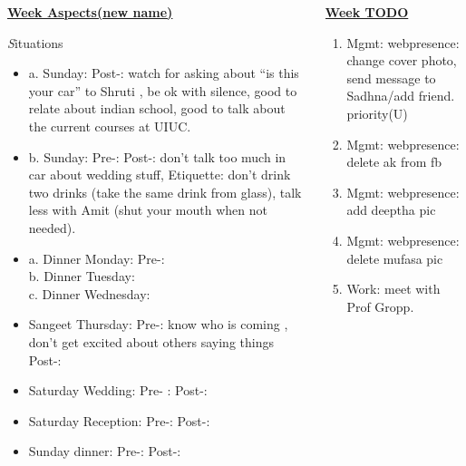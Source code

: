 \documentclass[serif,mathserif,final]{beamer}
\begin{document}
\begin{frame}{}
\begin{columns}[t]
\begin{column}{0.30\linewidth} {\textbf{\underline{Week Aspects(new name)}}}
\begin{block}{\textit Situations}
\begin{itemize}
      b. Saturday at Amit's house: Pre-: Post-: don't have to tell dad about when I first met Atul and Ridhima \\

\item \tiny 
  a. Sunday:  Post-: watch for asking about ``is this your car'' to Shruti ,  be ok with silence, good to relate about indian school, good to talk about the current courses at UIUC. \\

  \item \tiny  b. Sunday: Pre-: Post-: don't talk too much in car about wedding stuff, Etiquette: don't drink two drinks (take the same drink from glass), talk less with Amit (shut your mouth when not needed).\\

\item \tiny 
  
  a. Dinner Monday: Pre-:  \\ 
  b. Dinner Tuesday:   \\
  c. Dinner Wednesday:  \\

\item \tiny Sangeet Thursday: Pre-: know who is coming , don't get excited about others saying things Post-: 
\item \tiny Saturday Wedding: Pre- :   Post-: 
\item \tiny  Saturday Reception: Pre-:    Post-: 
\item \tiny  Sunday dinner:  Pre-:   Post-:  
    \end{itemize}
  \end{block} 
\end{column} %

\begin{column}{0.33\linewidth}{\textbf{\underline{Week TODO}}} 

\begin{block}

\begin{enumerate} 
\item \tiny Mgmt: webpresence: change cover photo, send message to Sadhna/add friend. priority(U)
\item \tiny Mgmt: webpresence: delete ak from fb 
\item \tiny Mgmt: webpresence: add deeptha pic 
\item \tiny Mgmt: webpresence: delete mufasa pic 
\item \tiny Work: meet with Prof Gropp. 


\end{enumerate}
\end{block}
\end{column}
\end{columns}
\end{frame}
\end{document}
